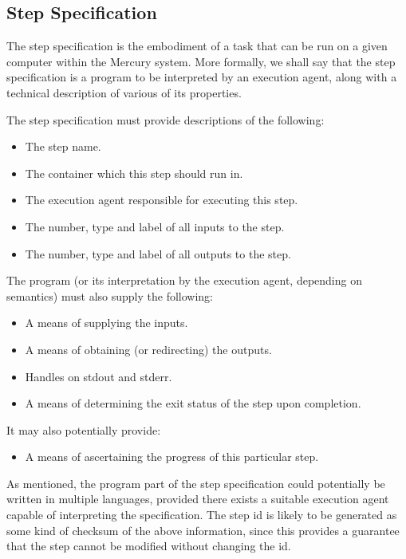\documentclass[10pt,a4paper]{article}
\newcommand{\npar}{\par\noindent\space}
\begin{document}
\subsection{Step Specification}
\label{sec:stepSpec}
\npar The step specification is the embodiment of a task that can be run on a given computer within the Mercury system. More formally, we shall say that the step specification is a program to be interpreted by an execution agent, along with a technical description of various of its properties.
\npar The step specification must provide descriptions of the following:
\begin{itemize}
\item The step name.
\item The container which this step should run in.
\item The execution agent responsible for executing this step.
\item The number, type and label of all inputs to the step.
\item The number, type and label of all outputs to the step.
\end{itemize}
\npar The program (or its interpretation by the execution agent, depending on semantics) must also supply the following:
\begin{itemize}
\item A means of supplying the inputs.
\item A means of obtaining (or redirecting) the outputs.
\item Handles on stdout and stderr.
\item A means of determining the exit status of the step upon completion.
\end{itemize}
\npar It may also potentially provide:
\begin{itemize}
\item A means of ascertaining the progress of this particular step.
\end{itemize}
\npar As mentioned, the program part of the step specification could potentially be written in multiple languages, provided there exists a suitable execution agent capable of interpreting the specification. The step id is likely to be generated as some kind of checksum of the above information, since this provides a guarantee that the step cannot be modified without changing the id.
\end{document}
